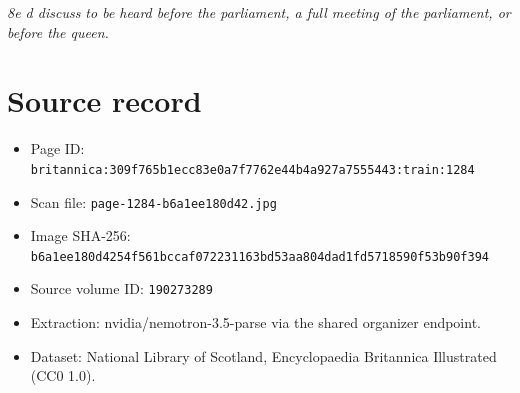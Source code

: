 \documentclass{article}
\begin{document}
\textit{8e d discuss to be heard before the parliament, a full meeting of the parliament, or before the queen.}
\section*{Source record}
\begin{itemize}
\item Page ID: \texttt{britannica:309f765b1ecc83e0a7f7762e44b4a927a7555443:train:1284}
\item Scan file: \texttt{page-1284-b6a1ee180d42.jpg}
\item Image SHA-256: \texttt{b6a1ee180d4254f561bccaf072231163bd53aa804dad1fd5718590f53b90f394}
\item Source volume ID: \texttt{190273289}
\item Extraction: nvidia/nemotron-3.5-parse via the shared organizer endpoint.
\item Dataset: National Library of Scotland, Encyclopaedia Britannica Illustrated (CC0 1.0).
\end{itemize}
\end{document}
